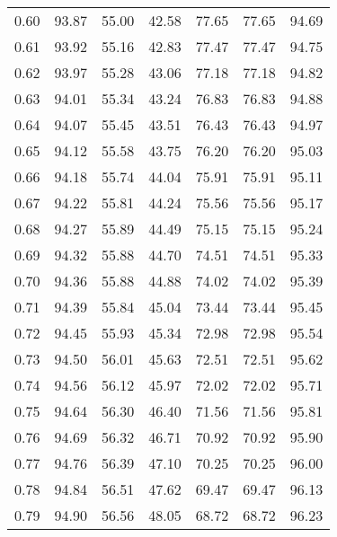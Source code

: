 \begin{tabular}{|c|c|c|c|c|c|c|}
      0.60 &     93.87 &     55.00 &      42.58 &   77.65 &      77.65 &         94.69 \\
      0.61 &     93.92 &     55.16 &      42.83 &   77.47 &      77.47 &         94.75 \\
      0.62 &     93.97 &     55.28 &      43.06 &   77.18 &      77.18 &         94.82 \\
      0.63 &     94.01 &     55.34 &      43.24 &   76.83 &      76.83 &         94.88 \\
      0.64 &     94.07 &     55.45 &      43.51 &   76.43 &      76.43 &         94.97 \\
      0.65 &     94.12 &     55.58 &      43.75 &   76.20 &      76.20 &         95.03 \\
      0.66 &     94.18 &     55.74 &      44.04 &   75.91 &      75.91 &         95.11 \\
      0.67 &     94.22 &     55.81 &      44.24 &   75.56 &      75.56 &         95.17 \\
      0.68 &     94.27 &     55.89 &      44.49 &   75.15 &      75.15 &         95.24 \\
      0.69 &     94.32 &     55.88 &      44.70 &   74.51 &      74.51 &         95.33 \\
      0.70 &     94.36 &     55.88 &      44.88 &   74.02 &      74.02 &         95.39 \\
      0.71 &     94.39 &     55.84 &      45.04 &   73.44 &      73.44 &         95.45 \\
      0.72 &     94.45 &     55.93 &      45.34 &   72.98 &      72.98 &         95.54 \\
      0.73 &     94.50 &     56.01 &      45.63 &   72.51 &      72.51 &         95.62 \\
      0.74 &     94.56 &     56.12 &      45.97 &   72.02 &      72.02 &         95.71 \\
      0.75 &     94.64 &     56.30 &      46.40 &   71.56 &      71.56 &         95.81 \\
      0.76 &     94.69 &     56.32 &      46.71 &   70.92 &      70.92 &         95.90 \\
      0.77 &     94.76 &     56.39 &      47.10 &   70.25 &      70.25 &         96.00 \\
      0.78 &     94.84 &     56.51 &      47.62 &   69.47 &      69.47 &         96.13 \\
      0.79 &     94.90 &     56.56 &      48.05 &   68.72 &      68.72 &         96.23 \\

\end{tabular}
